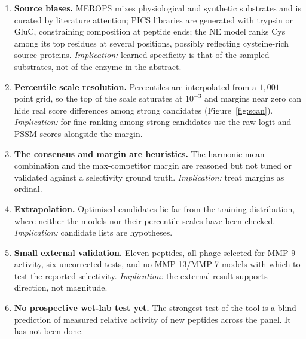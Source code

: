 \begin{enumerate}
\item \textbf{Source biases.} MEROPS mixes physiological and synthetic substrates and is curated by literature attention; PICS libraries are generated with trypsin or GluC, constraining composition at peptide ends; the NE model ranks Cys among its top residues at several positions, possibly reflecting cysteine-rich source proteins. \emph{Implication:} learned specificity is that of the sampled substrates, not of the enzyme in the abstract.
\item \textbf{Percentile scale resolution.} Percentiles are interpolated from a $1{,}001$-point grid, so the top of the scale saturates at $10^{-3}$ and margins near zero can hide real score differences among strong candidates (Figure~\ref{fig:scan}). \emph{Implication:} for fine ranking among strong candidates use the raw logit and PSSM scores alongside the margin.
\item \textbf{The consensus and margin are heuristics.} The harmonic-mean combination and the max-competitor margin are reasoned but not tuned or validated against a selectivity ground truth. \emph{Implication:} treat margins as ordinal.
\item \textbf{Extrapolation.} Optimised candidates lie far from the training distribution, where neither the models nor their percentile scales have been checked. \emph{Implication:} candidate lists are hypotheses.
\item \textbf{Small external validation.} Eleven peptides, all phage-selected for MMP-9 activity, six uncorrected tests, and no MMP-13/MMP-7 models with which to test the reported selectivity. \emph{Implication:} the external result supports direction, not magnitude.
\item \textbf{No prospective wet-lab test yet.} The strongest test of the tool is a blind prediction of measured relative activity of new peptides across the panel. It has not been done.
\end{enumerate}

